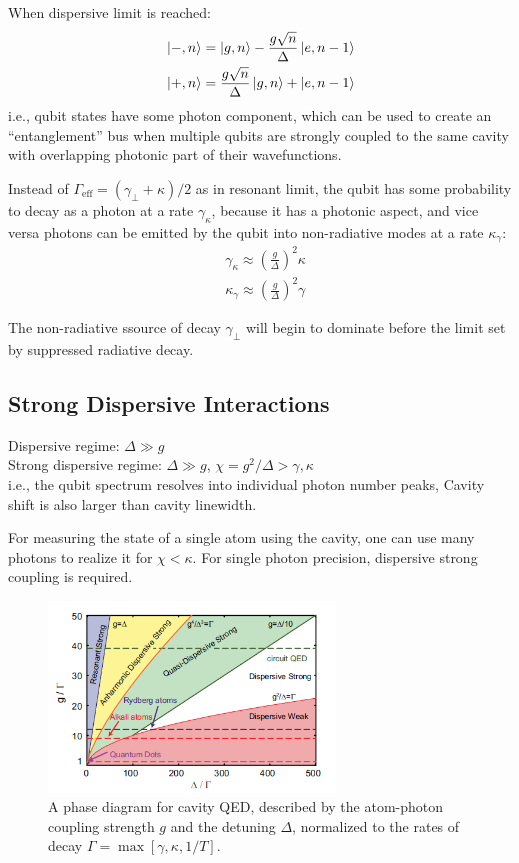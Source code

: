 \documentclass[8pt,a4paper,twocolumn]{article} %
\numberwithin{equation}{section} %
\begin{document}
			When dispersive limit is reached:
			\begin{align}
				& \ket{-,n} =  \ket{g,n} -\frac{g\sqrt n}{\Delta}  \ket{e,n-1}\\
				& \ket{+,n} = \frac{g\sqrt n}{\Delta}  \ket{g,n} +   \ket{e,n-1}
			\end{align}
			i.e., qubit states have some photon component, which can be used to create an ``entanglement'' bus when multiple qubits are strongly coupled to the same cavity with overlapping photonic part of their wavefunctions.

			Instead of $\Gamma_{\text{eff} }=(\gamma_{\perp}+\kappa)/2 $ as in resonant limit, the qubit has some probability to decay as a photon at a rate $ \gamma_{\kappa} $, because it has a photonic aspect, and vice versa photons can be emitted by the qubit into non-radiative modes at a rate $\kappa_{\gamma} $:
			\begin{align}
				&\gamma_{\kappa}\approx \left( \frac{g}{\Delta} \right)^2 \kappa\\
				&\kappa_{\gamma}\approx \left( \frac{g}{\Delta} \right)^2 \gamma
			\end{align}

			The non-radiative ssource of decay $\gamma_{\perp}$ will begin to dominate before the limit set by suppressed radiative decay.


		\subsection{Strong Dispersive Interactions} %
		\label{sub:strong_dispersive_interactions}
			Dispersive regime: $\Delta\gg g$\\
			Strong dispersive regime: $\Delta\gg g$, $\chi = g^2/\Delta > \gamma, \kappa$\\
			i.e., the qubit spectrum resolves into individual photon number peaks, Cavity shift is also larger than cavity linewidth.

			For measuring the state of a single atom using the cavity, one can use many photons to realize it for $\chi<\kappa$. For single photon precision, dispersive strong coupling is required.

			\begin{figure}[!h]
				\centering
				\includegraphics[width=3in]{cQEDphase.png}
				\caption{A phase diagram for cavity QED, described by the atom-photon coupling strength $g$ and the detuning $\Delta$, normalized to the rates of decay $\Gamma = \max[ \gamma,\kappa,1/T ]. $\cite{Schuster2007}}
				\label{pic:cQEDphase}
			\end{figure}
\end{document}
